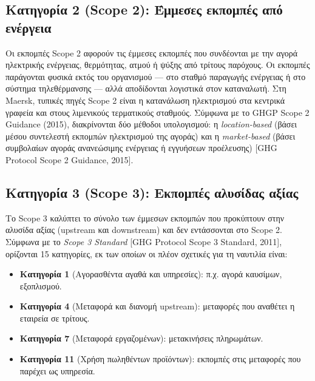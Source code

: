 \subsection{Κατηγορία 2 (Scope 2): Έμμεσες εκπομπές από
ενέργεια}\label{ux3baux3b1ux3c4ux3b7ux3b3ux3bfux3c1ux3afux3b1-2-scope-2-ux3adux3bcux3bcux3b5ux3c3ux3b5ux3c2-ux3b5ux3baux3c0ux3bfux3bcux3c0ux3adux3c2-ux3b1ux3c0ux3cc-ux3b5ux3bdux3adux3c1ux3b3ux3b5ux3b9ux3b1}

Οι εκπομπές Scope 2 αφορούν τις έμμεσες εκπομπές που συνδέονται με την
αγορά ηλεκτρικής ενέργειας, θερμότητας, ατμού ή ψύξης από τρίτους
παρόχους. Οι εκπομπές παράγονται φυσικά εκτός του οργανισμού --- στο
σταθμό παραγωγής ενέργειας ή στο σύστημα τηλεθέρμανσης --- αλλά
αποδίδονται λογιστικά στον καταναλωτή. Στη Maersk, τυπικές πηγές Scope 2
είναι η κατανάλωση ηλεκτρισμού στα κεντρικά γραφεία και στους λιμενικούς
τερματικούς σταθμούς. Σύμφωνα με το GHGP Scope 2 Guidance (2015),
διακρίνονται δύο μέθοδοι υπολογισμού: η \emph{location-based} (βάσει
μέσου συντελεστή εκπομπών ηλεκτρισμού της αγοράς) και η
\emph{market-based} (βάσει συμβολαίων αγοράς ανανεώσιμης ενέργειας ή
εγγυήσεων προέλευσης) {[}GHG Protocol Scope 2 Guidance, 2015{]}.

\subsection{Κατηγορία 3 (Scope 3): Εκπομπές αλυσίδας
αξίας}\label{ux3baux3b1ux3c4ux3b7ux3b3ux3bfux3c1ux3afux3b1-3-scope-3-ux3b5ux3baux3c0ux3bfux3bcux3c0ux3adux3c2-ux3b1ux3bbux3c5ux3c3ux3afux3b4ux3b1ux3c2-ux3b1ux3beux3afux3b1ux3c2}

Το Scope 3 καλύπτει το σύνολο των έμμεσων εκπομπών που προκύπτουν στην
αλυσίδα αξίας (upstream και downstream) και δεν εντάσσονται στο Scope 2.
Σύμφωνα με το \emph{Scope 3 Standard} {[}GHG Protocol Scope 3 Standard,
2011{]}, ορίζονται 15 κατηγορίες, εκ των οποίων οι πλέον σχετικές για τη
ναυτιλία είναι:

\begin{itemize}
\tightlist
\item
  \textbf{Κατηγορία 1} (Αγορασθέντα αγαθά και υπηρεσίες): π.χ. αγορά
  καυσίμων, εξοπλισμού.
\item
  \textbf{Κατηγορία 4} (Μεταφορά και διανομή upstream): μεταφορές που
  αναθέτει η εταιρεία σε τρίτους.
\item
  \textbf{Κατηγορία 7} (Μεταφορά εργαζομένων): μετακινήσεις πληρωμάτων.
\item
  \textbf{Κατηγορία 11} (Χρήση πωληθέντων προϊόντων): εκπομπές στις
  μεταφορές που παρέχει ως υπηρεσία.
\end{itemize}

